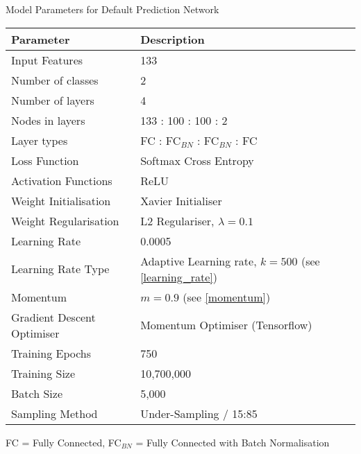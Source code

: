         \begin{center}
            \centering
            \caption{Model Parameters for Default Prediction Network} \vspace{0.5cm}
            \label{4: default_parameters}
            \begin{tabular}{|p{6cm}|p{8cm}|}
                \hline \textbf{Parameter} & \textbf{Description} \\ \hline \hline
                
                Input Features & 133  \\ \hline
                Number of classes & 2  \\ \hline
                Number of layers & 4  \\ \hline
                Nodes in layers &        133 : 100 : 100 : 2 \\ \hline
                Layer types & FC : FC$_{BN}$  : FC$_{BN}$ : FC  \\ \hline
                Loss Function & Softmax Cross Entropy  \\ \hline
                Activation Functions & ReLU  \\ \hline
                Weight Initialisation & Xavier Initialiser  \\ \hline
                Weight Regularisation & L2 Regulariser, $\lambda = 0.1$  \\ \hline
                Learning Rate & 0.0005  \\ \hline
                Learning Rate Type & Adaptive Learning rate, $k = 500$ (see \ref{learning_rate})  \\ \hline
                Momentum & $m = 0.9$ (see \ref{momentum}) \\ \hline
                Gradient Descent Optimiser & Momentum Optimiser (Tensorflow)  \\ \hline
                Training Epochs & 750  \\ \hline
                Training Size & 10,700,000  \\ \hline
                Batch Size & 5,000  \\ \hline
                Sampling Method & Under-Sampling / 15:85  \\ \hline
                
            \end{tabular}
            
            \vspace*{0.4cm}

            {\footnotesize FC = Fully Connected, FC$_{BN}$ = Fully Connected with Batch Normalisation}

        \end{center}  
        
